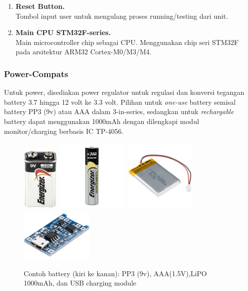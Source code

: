 \documentclass[12pt,]{article}
\begin{document}
\begin{enumerate}
		\item \textbf{Reset Button.}\\
		Tombol input user untuk mengulang proses running/testing dari unit.
		
		\item \textbf{Main CPU STM32F-series.}\\
		Main microcontroller chip sebagai CPU. Menggunakan chip seri STM32F pada arsitektur ARM32 Cortex-M0/M3/M4.
		
	\end{enumerate}
	
	\subsubsection{Power-Compats}
	
	Untuk power, disediakan power regulator untuk regulasi dan konversi tegangan battery 3.7 hingga 12 volt ke 3.3 volt. 
	Pilihan untuk \textit{one-use} battery semisal battery PP3 (9v) atau AAA dalam 3-in-series,
	sedangkan untuk \textit{rechargable} battery dapat menggunakan 1000mAh dengan dilengkapi modul monitor/charging berbasis IC TP-4056.
	
	\begin{figure}[!ht]
		\centering
		\includegraphics[width=50pt]{images/batt_pp3}
		\includegraphics[width=100pt]{images/batt_aaa}
		\includegraphics[width=100pt]{images/batt_lipo}
		\includegraphics[width=100pt]{images/batt_tp4056}
		\caption{Contoh battery (kiri ke kanan): PP3 (9v), AAA(1.5V),LiPO 1000mAh, dan USB charging module}
	\end{figure}
\end{document}
